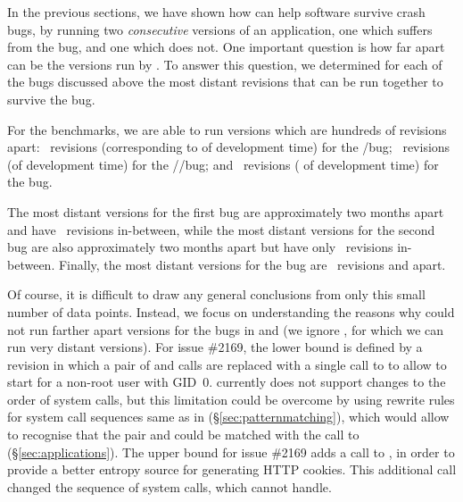 In the previous sections, we have shown how \mx can help software
survive crash bugs, by running two \textit{consecutive} versions of an
application, one which suffers from the bug, and one which does not.
%
One important question is how far apart can be the versions run
by \mx.  To answer this question, we determined for each of the bugs
discussed above the most distant revisions that can be run together to
survive the bug.  

For the \coreutils benchmarks, we are able to run versions which are
hundreds of revisions apart: \maxDistMdsum~revisions (corresponding to
\timeSpanMdsum of development time) for the \mdsum/\shasum bug; 
\maxDistMkdir~revisions (\timeSpanMkdir of development time) for the 
\mkdir/\mkfifo/\mknod bug; and \maxDistCut~revisions (\timeSpanCut 
of development time) for the \cut bug.

The most distant versions for the first \lighttpd bug are
approximately two months apart and have \maxDistLighttpdOne~revisions
in-between, while the most distant versions for the second
\lighttpd bug are also approximately two months apart but have only
\maxDistLighttpdTwo~revisions in-between.  Finally, the most distant
versions for the \redis bug are \maxDistRedis~revisions
and \timeSpanRedis apart.  

Of course, it is difficult to draw any general conclusions from only
this small number of data points.  Instead, we focus on understanding
the reasons why \mx could not run farther apart versions for the bugs
in \lighttpd and \redis (we ignore \coreutils, for which we can run
very distant versions).
%
For \lighttpd issue \#2169, the lower bound is defined by a revision
in which a pair of  and  calls
are replaced with a single call to  to
allow \lighttpd to start for a non-root user with GID~0.  \mx 
currently does not support changes to the order of system calls, but
this limitation could be overcome by using rewrite rules for system call
sequences same as in \varan (\S\ref{sec:patternmatching}), which would
allow \mx to recognise that the pair  and
 could be matched with the call to
 (\S\ref{sec:applications}).  The upper bound for
\lighttpd issue \#2169 adds a  call to
, in order to provide a better entropy source
for generating HTTP cookies.  This additional  call
changed the sequence of system calls, which \mx cannot handle.

